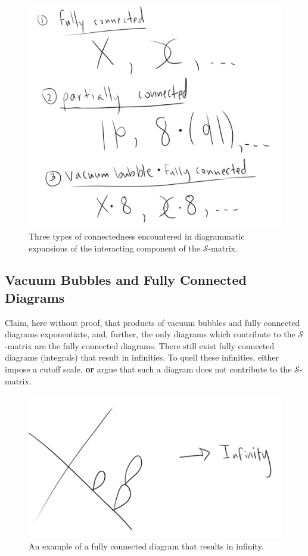 \begin{figure}[H]
	\centering
	\includegraphics[scale=0.6]{connectiontypes.png}
	\caption{Three types of connectedness encountered in diagrammatic expansions of the interacting component of the $\mathcal{S}$-matrix.}
\end{figure}
 
\subsection*{Vacuum Bubbles and Fully Connected Diagrams}

\noindent Claim, here without proof, that products of vacuum bubbles and fully connected diagrams exponentiate, and, further, the only diagrams which contribute to the $\mathcal{S}$-matrix are the fully connected diagrams. There still exist fully connected diagrams (integrals) that result in infinities. To quell these infinities, either impose a cutoff scale, \textbf{or} argue that such a diagram does not contribute to the $\mathcal{S}$-matrix. \\

\begin{figure}[H]
	\centering
	\includegraphics[scale=0.4]{fullconninf.png}
	\caption{An example of a fully connected diagram that results in infinity.}
\end{figure}

